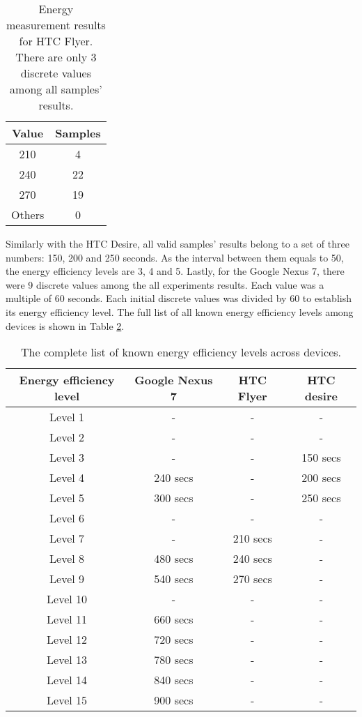\begin{table}[H]
\centering
    \begin{tabular}{| c | c |}
    \hline
    	Value & Samples \\ \hline
    	210 & 4 \\ \hline
    	240 & 22 \\ \hline
    	270 & 19 \\ \hline
    	Others & 0 \\ \hline
    \end{tabular}
    \caption{Energy measurement results for HTC Flyer. There are only 3 discrete values among all samples' results.}
	\label{table:discretevalues}
\end{table}
			
Similarly with the HTC Desire, all valid samples' results belong to a set of three numbers: 150, 200 and 250 seconds. As the interval between them equals to 50, the energy efficiency levels are 3, 4 and 5. Lastly, for the Google Nexus 7, there were 9 discrete values among the all experiments results. Each value was a multiple of 60 seconds. Each initial discrete values was divided by 60 to establish its energy efficiency level. The full list of all known energy efficiency levels among devices is shown in Table \ref{table:energy_efficiency_levels}.
		
	
\begin{table}[H]
\centering
    \begin{tabular}{| c | c | c | c |}
    \hline
      Energy efficiency level & Google Nexus 7 & HTC Flyer & HTC desire \\ \hline
    Level 1 & -& - &  -\\ \hline
  	Level 2 & - & - & -\\ \hline
  	Level 3 & - & - & 150 secs\\ \hline
    Level 4 & 240 secs & - & 200 secs\\ \hline
    Level 5 & 300 secs & - & 250 secs \\ \hline
    Level 6 & - & - & - \\\hline
    Level 7 & - & 210 secs & - \\ \hline
    Level 8 & 480 secs & 240  secs & - \\ \hline
    Level 9 & 540 secs & 270 secs & - \\ \hline
    Level 10 & - & - & - \\ \hline
    Level 11 & 660 secs & - & - \\ \hline
    Level 12 & 720 secs & - & -\\ \hline
    Level 13 & 780 secs & - & - \\ \hline
    Level 14 & 840 secs & - & -\\ \hline
    Level 15 & 900 secs & -& -\\ \hline
    \end{tabular}
    \caption{The complete list of known energy efficiency levels across devices.}
	\label{table:energy_efficiency_levels}
\end{table}
	
